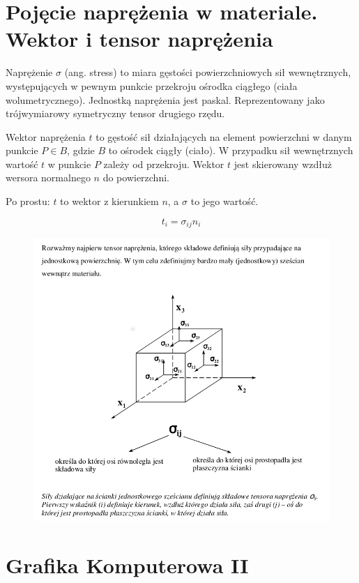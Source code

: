 \documentclass[12pt]{article}
\begin{document}
\section{Pojęcie naprężenia w materiale. Wektor i tensor naprężenia}
Naprężenie $\sigma$ (ang. stress) to miara gęstości powierzchniowych sił wewnętrznych, występujących w pewnym punkcie przekroju ośrodka ciągłego (ciała wolumetrycznego). Jednostką naprężenia jest paskal. Reprezentowany jako trójwymiarowy symetryczny tensor drugiego rzędu.

Wektor naprężenia $t$ to gęstość sił działających na element powierzchni w danym punkcie $P \in B$, gdzie $B$ to ośrodek ciągły (ciało). W przypadku sił wewnętrznych wartość $t$ w punkcie $P$ zależy od przekroju. Wektor $t$ jest skierowany wzdłuż wersora normalnego $n$ do powierzchni.

Po prostu: $t$ to wektor z kierunkiem $n$, a $\sigma$ to jego wartość.

\begin{equation}
t_{i} = \sigma_{ij}n_{i}
\end{equation}



\begin{figure}[H]
	\centering
	\includegraphics[scale=0.5]{Pictures/stress.png}
	\caption{}
\end{figure}

\section{Grafika Komputerowa II}
\end{document}
